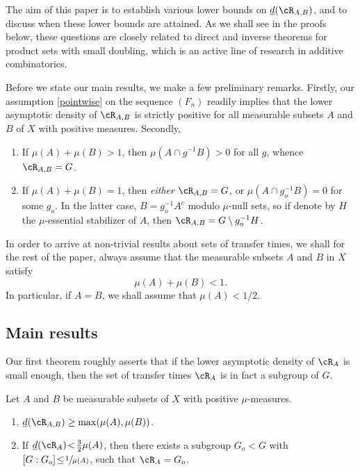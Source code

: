 The aim of this paper is to establish various lower bounds on $\underline{d}(\cR_{A,B})$, and to discuss when these lower bounds are attained. As we shall see in the proofs below, these questions are closely related to direct and inverse theorems for product sets with small doubling, which is an active line of research in additive combinatorics.

Before we state our main results, we make a few preliminary remarks. Firstly, our assumption \eqref{pointwise} on the sequence $(F_n)$ readily implies that the lower asymptotic density of $\cR_{A,B}$ is strictly positive for all measurable subsets $A$ and $B$ of $X$ with positive measures. Secondly,

\begin{enumerate}
\item
If $\mu(A) + \mu(B) > 1$, then $\mu(A \cap g^{-1}B) >0$ for all $g$, whence $\cR_{A,B} = G$.
\item
If $\mu(A) + \mu(B) = 1$, then \emph{either} $\cR_{A,B} = G$, or $\mu(A \cap g_o^{-1}B) = 0$ for some $g_o$.
In the latter case, $B = g_o^{-1}A^c$ modulo $\mu$-null sets, so if denote by $H$ the $\mu$-essential stabilizer of $A$,
then $\cR_{A,B} = G \setminus g_o^{-1} H$.
\end{enumerate}

In order to arrive at non-trivial results about sets of transfer times, we shall for the rest of the paper, always assume that the measurable
subsets $A$ and $B$ in $X$ satisfy
\begin{equation}
\label{standass}
\mu(A) + \mu(B) < 1.
\end{equation}
In particular, if $A = B$, we shall assume that $\mu(A) < 1/2$.

\subsection{Main results}

Our first theorem roughly asserts that if the lower asymptotic density of $\cR_A$ is small enough, then the set of transfer times $\cR_A$ is in fact a
subgroup of $G$.
\begin{theorem}
\label{thm1}
Let $A$ and $B$ be measurable subsets of $X$ with positive $\mu$-measures.

\begin{enumerate}
\item\label{thm1i}
$\underline{d}(\cR_{A,B}) \geq \max(\mu(A),\mu(B))$.
\item\label{thm1ii}
If $\underline{d}(\cR_A)\!<\!\frac{3}{2} \mu(A)$, then there exists a subgroup $G_o\!<\!G$ with
$[G : G_o]\!\leq\!\sfrac{1}{\mu(A)}$, such that $\cR_A = G_o$.
\end{enumerate}
\end{theorem}

